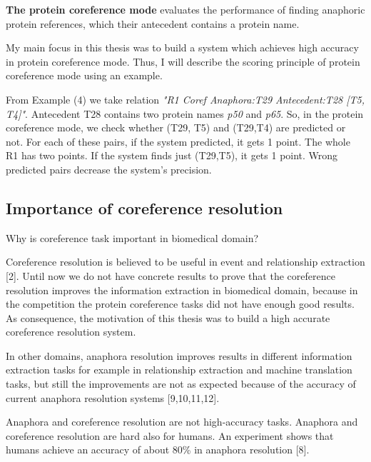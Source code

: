 \textbf{The protein coreference mode} evaluates the performance of finding anaphoric protein references, which their antecedent contains a protein name. 

My main focus in this thesis was to build a system which achieves high accuracy in protein coreference mode. Thus, I will describe the scoring principle of protein coreference mode using an example.

From Example (4) we take relation \emph{"R1 Coref Anaphora:T29 Antecedent:T28 [T5, T4]"}. Antecedent T28 contains two protein names \emph{p50} and \emph{p65}. So, in the protein coreference mode, we check whether (T29, T5) and (T29,T4) are predicted or not. For each of these pairs, if the system predicted, it gets 1 point. The whole R1 has two points. If the system finds just (T29,T5), it gets 1 point. Wrong predicted pairs decrease the system's precision. 

\subsection{Importance of coreference resolution}

Why is coreference task important in biomedical domain?

Coreference resolution is believed to be useful in event and relationship extraction [2]. Until now we do not have concrete results to prove that the coreference resolution improves the information extraction in biomedical domain, because in the competition the protein coreference tasks did not have enough good results. As consequence, the motivation of this thesis was to build a high accurate coreference resolution system.
 
In other domains, anaphora resolution improves results in different information extraction  tasks for example in relationship extraction and machine translation tasks, but still the improvements are not as expected because of the accuracy of current anaphora resolution systems [9,10,11,12].
 
Anaphora and coreference resolution are not high-accuracy tasks. Anaphora and coreference resolution are hard also for humans. An experiment shows that humans achieve an accuracy of about 80\% in anaphora resolution [8].


